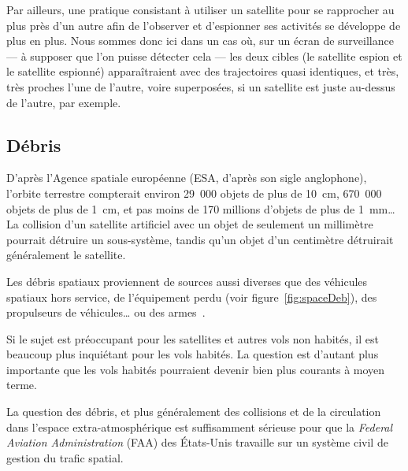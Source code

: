 	Par ailleurs, une pratique consistant à utiliser un satellite pour se rapprocher au plus près d'un autre afin de l'observer et d'espionner ses activités se développe de plus en plus. Nous sommes donc ici dans un cas où, sur un écran de surveillance --- à supposer que l'on puisse détecter cela --- les deux cibles (le satellite espion et le satellite espionné) apparaîtraient avec des trajectoires quasi identiques, et très, très proches l'une de l'autre, voire superposées, si un satellite est juste au-dessus de l'autre, par exemple.
	
	
	\FloatBarrier \subsection{Débris}
	D'après l'Agence spatiale européenne (ESA, d'après son sigle anglophone), l'orbite terrestre compterait environ 29~000 objets de plus de 10~cm, 670~000 objets de plus de 1~cm, et pas moins de 170 millions d'objets de plus de 1~mm\ldots{} La collision d'un satellite artificiel avec un objet de seulement un millimètre pourrait détruire un sous-système, tandis qu'un objet d'un centimètre détruirait généralement le satellite\footnotemark.
	
	
	Les débris spatiaux proviennent de sources aussi diverses que des véhicules spatiaux hors service, de l'équipement perdu (voir figure~\ref{fig:spaceDeb}), des propulseurs de véhicules\ldots{} ou des armes\footnotemark~\cite{chun1999shooting}.
	
	
	Si le sujet est préoccupant pour les satellites et autres vols non habités, il est beaucoup plus inquiétant pour les vols habités. La question est d'autant plus importante que les vols habités pourraient devenir bien plus courants à moyen terme\footnotemark.
	
	
	La question des débris, et plus généralement des collisions et de la circulation dans l'espace extra-atmosphérique est suffisamment sérieuse pour que la \emph{Federal Aviation Administration} (FAA) des États-Unis travaille sur un système civil de gestion du trafic spatial\footnotemark.
	
